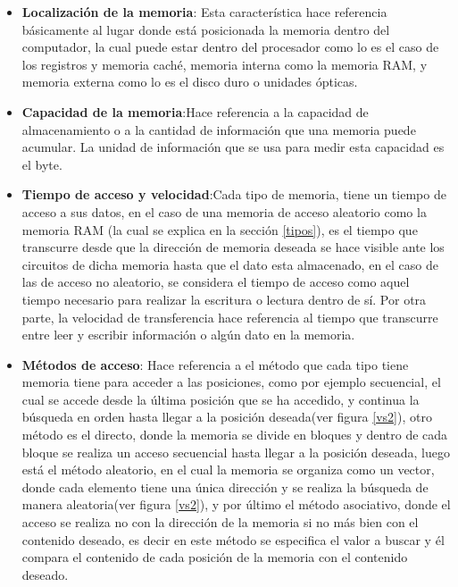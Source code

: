 \documentclass{article}
\begin{document}
\begin{itemize}
    \item \textbf{Localización de la memoria}: Esta característica hace referencia básicamente al lugar donde está posicionada la memoria dentro del computador, la cual puede estar dentro del procesador como lo es el caso de los registros y memoria caché, memoria interna como la memoria RAM, y memoria externa como lo es el disco duro o unidades ópticas.
        
    \item \textbf{Capacidad de la memoria}:Hace referencia a la capacidad de almacenamiento o a la cantidad de información que una memoria puede acumular. La unidad de información que se usa para medir esta capacidad es el byte. \cite{arquitectura}
    
    \item \textbf{Tiempo de acceso y velocidad}:Cada tipo de memoria, tiene un tiempo de acceso a sus datos, en el caso de una memoria de acceso aleatorio como la memoria RAM (la cual se explica en la sección \ref{tipos}), es el tiempo que transcurre desde que la dirección de memoria deseada se hace visible ante los circuitos de dicha memoria hasta que el dato esta almacenado, en el caso de las de acceso no aleatorio, se considera el tiempo de acceso como aquel tiempo necesario para realizar la escritura o lectura dentro de sí. Por otra parte, la velocidad de transferencia hace referencia al tiempo que transcurre entre leer y escribir información o algún dato en la memoria. \cite{arquitectura}

    
    \item \textbf {Métodos de acceso}: Hace referencia a el método que cada tipo tiene memoria tiene para acceder a las posiciones, como por ejemplo secuencial, el cual se accede desde la última posición que se ha accedido, y continua la búsqueda en orden hasta llegar a la posición deseada(ver figura \ref{vs2}), otro método es el directo, donde la memoria se divide en bloques y dentro de cada bloque se realiza un acceso secuencial hasta llegar a la posición deseada, luego está el método aleatorio, en el cual la memoria se organiza como un vector, donde cada elemento tiene una única dirección y se realiza la búsqueda de manera aleatoria(ver figura \ref{vs2}), y por último el método asociativo, donde el acceso se realiza no con la dirección de la memoria si no más bien con el contenido deseado, es decir en este método se especifica el valor a buscar y él compara el contenido de cada posición de la memoria con el contenido deseado. \cite{arquitectura}\\
    

\end{itemize}
\end{document}
